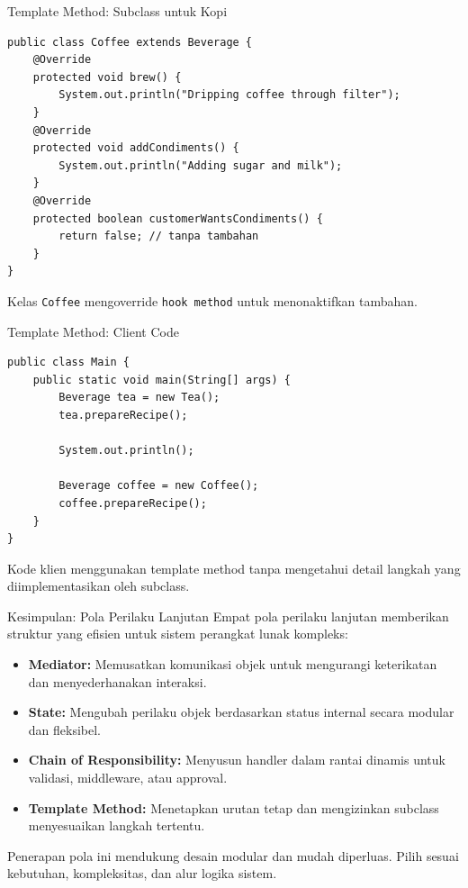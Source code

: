 \documentclass[aspectratio=169, table]{beamer}
\begin{document}
\begin{frame}[fragile]{Template Method: Subclass untuk Kopi}
\begin{lstlisting}[style=JavaStyle]
public class Coffee extends Beverage {
	@Override
	protected void brew() {
		System.out.println("Dripping coffee through filter");
	}
	@Override
	protected void addCondiments() {
		System.out.println("Adding sugar and milk");
	}
	@Override
	protected boolean customerWantsCondiments() {
		return false; // tanpa tambahan
	}
}
\end{lstlisting}
\vspace{4pt}
\small Kelas \texttt{Coffee} mengoverride \texttt{hook method} untuk menonaktifkan tambahan.
\end{frame}

\begin{frame}[fragile]{Template Method: Client Code}
\begin{lstlisting}[style=JavaStyle]
public class Main {
	public static void main(String[] args) {
		Beverage tea = new Tea();
		tea.prepareRecipe();
		
		System.out.println();
		
		Beverage coffee = new Coffee();
		coffee.prepareRecipe();
	}
}
\end{lstlisting}
\vspace{4pt}
\small Kode klien menggunakan template method tanpa mengetahui detail langkah yang diimplementasikan oleh subclass.
\end{frame}


\begin{frame}{Kesimpulan: Pola Perilaku Lanjutan}
	\vspace{10pt}
	Empat pola perilaku lanjutan memberikan struktur yang efisien untuk sistem perangkat lunak kompleks:
	
	\vspace{6pt}
	\begin{itemize}
		\item \textbf{Mediator:} Memusatkan komunikasi objek untuk mengurangi keterikatan dan menyederhanakan interaksi.
		
		\item \textbf{State:} Mengubah perilaku objek berdasarkan status internal secara modular dan fleksibel.
		
		\item \textbf{Chain of Responsibility:} Menyusun handler dalam rantai dinamis untuk validasi, middleware, atau approval.
		
		\item \textbf{Template Method:} Menetapkan urutan tetap dan mengizinkan subclass menyesuaikan langkah tertentu.
	\end{itemize}
	
	\vspace{6pt}
	\small Penerapan pola ini mendukung desain modular dan mudah diperluas. Pilih sesuai kebutuhan, kompleksitas, dan alur logika sistem.
\end{frame}
\end{document}
